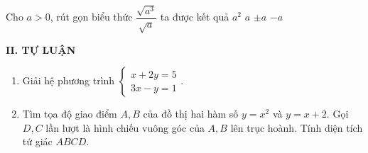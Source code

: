 \begin{ex}%
Cho $a>0$, rút gọn biểu thức $\dfrac{\sqrt{a^3}}{\sqrt{a}}$ ta được kết quả
\choice
{$a^2$}
{\True $a$}
{$\pm a$}
{ $-a$}
\end{ex} 
{\textbf{II. TỰ LUẬN}}

\begin{ex}%
\begin{enumerate}
\item Giải hệ phương trình $\begin{cases} x+2y=5\\ 3x-y=1 \end{cases}.$
\item Tìm tọa độ giao điểm $A,B$ của đồ thị hai hàm số $y=x^2$ và $y=x+2$. Gọi $D,C$ lần lượt là hình chiếu vuông góc của $A,B$ lên trục hoành. Tính diện tích tứ giác $ABCD$.
\end{enumerate}
\end{ex}
